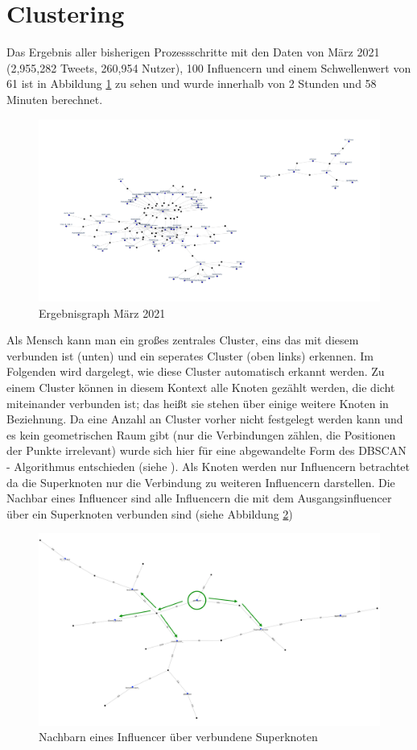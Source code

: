 \section{Clustering}
Das Ergebnis aller bisherigen Prozessschritte mit den Daten von März 2021 (2,955,282 Tweets, 260,954 Nutzer), 100 Influencern und einem Schwellenwert von 61 ist in Abbildung \ref{fig:noclusters} zu sehen und wurde innerhalb von 2 Stunden und 58 Minuten berechnet. 
\begin{figure}[h!]
	\centering
	\includegraphics[width=\linewidth]{images/NoClusters}
	\caption{Ergebnisgraph März 2021}
	\label{fig:noclusters}
\end{figure}
Als Mensch kann man ein  großes zentrales \gls{Cluster}, eins das mit diesem verbunden ist (unten) und ein seperates \gls{Cluster} (oben links) erkennen. 
Im Folgenden wird dargelegt, wie diese \gls{Cluster} automatisch erkannt werden.
Zu einem \gls{Cluster} können in diesem Kontext alle Knoten gezählt werden, die dicht miteinander verbunden ist; das heißt sie stehen über einige weitere Knoten in Beziehnung.
Da eine Anzahl an \gls{Cluster} vorher nicht festgelegt werden kann und es kein geometrischen Raum gibt (nur die Verbindungen zählen, die Positionen der Punkte irrelevant) wurde sich hier für eine abgewandelte Form des DBSCAN - Algorithmus entschieden (siehe \cite{dbscan}).
Als Knoten werden nur Influencern betrachtet da die Superknoten nur die Verbindung zu weiteren Influencern darstellen. 
Die Nachbar eines Influencer sind alle Influencern die mit dem Ausgangsinfluencer über ein Superknoten verbunden sind (siehe Abbildung \ref{fig:dbscan-neighbours})
\begin{figure}
	\centering
	\includegraphics[width=0.7\linewidth]{images/DBSCAN-neighbours}
	\caption{Nachbarn eines Influencer über verbundene Superknoten}
	\label{fig:dbscan-neighbours}
\end{figure}
